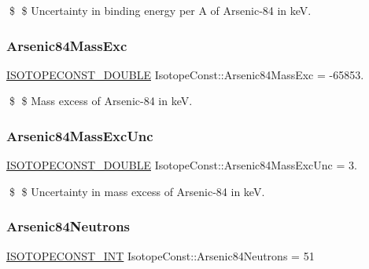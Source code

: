\$ \$ Uncertainty in binding energy per A of Arsenic-\/84 in keV. \mbox{\label{group___isotope_const-_arsenic-_as84_ga0ed113ee7026860920c41739c7399df2}} 
\subsubsection{\texorpdfstring{Arsenic84\+Mass\+Exc}{Arsenic84MassExc}}
{\footnotesize\ttfamily \mbox{\hyperlink{group___isotope_const-_macros_ga8f45a7272ce02c0b4c65c44636ed719a}{I\+S\+O\+T\+O\+P\+E\+C\+O\+N\+S\+T\+\_\+\+D\+O\+U\+B\+LE}} Isotope\+Const\+::\+Arsenic84\+Mass\+Exc = -\/65853.}

\$ \$ Mass excess of Arsenic-\/84 in keV. \mbox{\label{group___isotope_const-_arsenic-_as84_ga8b21015adcc60f618b2e21a52a9dc25a}} 
\subsubsection{\texorpdfstring{Arsenic84\+Mass\+Exc\+Unc}{Arsenic84MassExcUnc}}
{\footnotesize\ttfamily \mbox{\hyperlink{group___isotope_const-_macros_ga8f45a7272ce02c0b4c65c44636ed719a}{I\+S\+O\+T\+O\+P\+E\+C\+O\+N\+S\+T\+\_\+\+D\+O\+U\+B\+LE}} Isotope\+Const\+::\+Arsenic84\+Mass\+Exc\+Unc = 3.}

\$ \$ Uncertainty in mass excess of Arsenic-\/84 in keV. \mbox{\label{group___isotope_const-_arsenic-_as84_gae2891f85d3c9b2010c1cbfaf7b9c9c00}} 
\subsubsection{\texorpdfstring{Arsenic84\+Neutrons}{Arsenic84Neutrons}}
{\footnotesize\ttfamily \mbox{\hyperlink{group___isotope_const-_macros_ga5f18360b3e99483a35c32d789e62621c}{I\+S\+O\+T\+O\+P\+E\+C\+O\+N\+S\+T\+\_\+\+I\+NT}} Isotope\+Const\+::\+Arsenic84\+Neutrons = 51}

